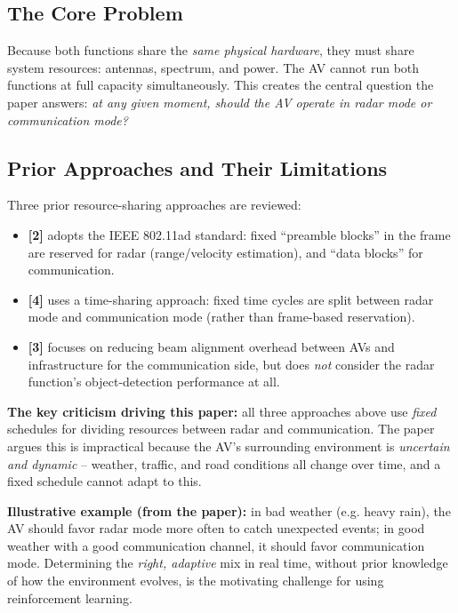 \documentclass[11pt]{article}
\begin{document}
\subsection{The Core Problem}
Because both functions share the \emph{same physical hardware}, they must share system
resources: antennas, spectrum, and power. The AV cannot run both functions at full
capacity simultaneously. This creates the central question the paper answers:
\emph{at any given moment, should the AV operate in radar mode or communication mode?}

\subsection{Prior Approaches and Their Limitations}
Three prior resource-sharing approaches are reviewed:

\begin{itemize}[leftmargin=1.5em]
    \item \textbf{[2]} adopts the IEEE 802.11ad standard: fixed ``preamble blocks'' in
    the frame are reserved for radar (range/velocity estimation), and ``data blocks''
    for communication.
    \item \textbf{[4]} uses a time-sharing approach: fixed time cycles are split between
    radar mode and communication mode (rather than frame-based reservation).
    \item \textbf{[3]} focuses on reducing beam alignment overhead between AVs and
    infrastructure for the communication side, but does \emph{not} consider the radar
    function's object-detection performance at all.
\end{itemize}

\textbf{The key criticism driving this paper:} all three approaches above use
\emph{fixed} schedules for dividing resources between radar and communication. The
paper argues this is impractical because the AV's surrounding environment is
\emph{uncertain and dynamic} -- weather, traffic, and road conditions all change over
time, and a fixed schedule cannot adapt to this.

\textbf{Illustrative example (from the paper):} in bad weather (e.g. heavy rain), the AV
should favor radar mode more often to catch unexpected events; in good weather with a
good communication channel, it should favor communication mode. Determining the
\emph{right, adaptive} mix in real time, without prior knowledge of how the environment
evolves, is the motivating challenge for using reinforcement learning.
\end{document}

